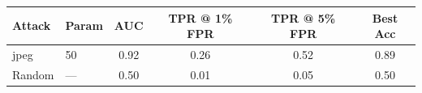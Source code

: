 \begin{tabular}{llcccc}
\toprule
Attack & Param & AUC & TPR @ 1\% FPR & TPR @ 5\% FPR & Best Acc \\
\midrule
jpeg & 50 & 0.92 & 0.26 & 0.52 & 0.89 \\
Random & — & 0.50 & 0.01 & 0.05 & 0.50 \\
\bottomrule
\end{tabular}
